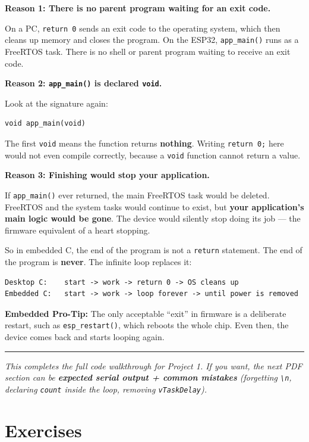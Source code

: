 \documentclass[11pt]{article}
\begin{document}
\textbf{Reason 1: There is no parent program waiting for an exit code.}

On a PC, \texttt{return 0} sends an exit code to the operating system, which then cleans up memory and closes the program. On the ESP32, \texttt{app\_main()} runs as a FreeRTOS task. There is no shell or parent program waiting to receive an exit code.

\textbf{Reason 2: \texttt{app\_main()} is declared \texttt{void}.}

Look at the signature again:

\begin{verbatim}
void app_main(void)
\end{verbatim}

The first \texttt{void} means the function returns \textbf{nothing}. Writing \texttt{return 0;} here would not even compile correctly, because a \texttt{void} function cannot return a value.

\textbf{Reason 3: Finishing would stop your application.}

If \texttt{app\_main()} ever returned, the main FreeRTOS task would be deleted. FreeRTOS and the system tasks would continue to exist, but \textbf{your application's main logic would be gone}. The device would silently stop doing its job --- the firmware equivalent of a heart stopping.

So in embedded C, the end of the program is not a \texttt{return} statement. The end of the program is \textbf{never}. The infinite loop replaces it:

\begin{verbatim}
Desktop C:    start -> work -> return 0 -> OS cleans up
Embedded C:   start -> work -> loop forever -> until power is removed
\end{verbatim}

\textbf{Embedded Pro-Tip:} The only acceptable ``exit'' in firmware is a deliberate restart, such as \texttt{esp\_restart()}, which reboots the whole chip. Even then, the device comes back and starts looping again.

\bigskip
\noindent\rule{\textwidth}{0.4pt}
\bigskip

\noindent \emph{This completes the full code walkthrough for Project 1. If you want, the next PDF section can be \textbf{expected serial output + common mistakes} (forgetting \texttt{\textbackslash{}n}, declaring \texttt{count} inside the loop, removing \texttt{vTaskDelay}).}

\section*{Exercises}
\end{document}
